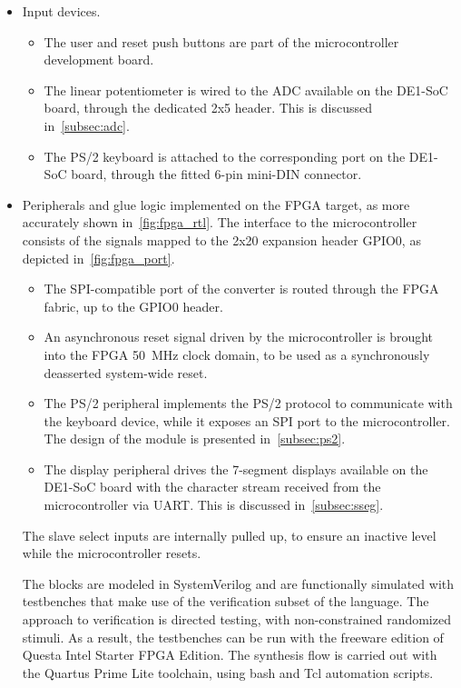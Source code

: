 \begin{itemize}
    \item Input devices.
    \begin{itemize}
        \item The user and reset push buttons are part of the microcontroller development board.
        \item The linear potentiometer is wired to the ADC available on the DE1-SoC board, through the dedicated 2x5 header. This is discussed in~\cref{subsec:adc}.
        \item The PS/2 keyboard is attached to the corresponding port on the DE1-SoC board, through the fitted 6-pin mini-DIN connector.
    \end{itemize}
    
    \item Peripherals and glue logic implemented on the FPGA target, as more accurately shown in~\cref{fig:fpga_rtl}.
    The interface to the microcontroller consists of the signals mapped to the 2x20 expansion header GPIO0, as depicted in~\cref{fig:fpga_port}.
    \begin{itemize}
        \item The SPI-compatible port of the converter is routed through the FPGA fabric, up to the GPIO0 header.
        \item An asynchronous reset signal driven by the microcontroller is brought into the FPGA \qty{50}{\MHz} clock domain, to be used as a synchronously deasserted system-wide reset.
        \item The PS/2 peripheral implements the PS/2 protocol to communicate with the keyboard device, while it exposes an SPI port to the microcontroller. The design of the module is presented in~\cref{subsec:ps2}.
        \item The display peripheral drives the 7-segment displays available on the DE1-SoC board with the character stream received from the microcontroller via UART. This is discussed in~\cref{subsec:sseg}.
    \end{itemize}
    The slave select inputs are internally pulled up, to ensure an inactive level while the microcontroller resets.

    The blocks are modeled in SystemVerilog and are functionally simulated with testbenches that make use of the verification subset of the language. The approach to verification is directed testing, with non-constrained randomized stimuli. As a result, the testbenches can be run with the freeware edition of Questa Intel Starter FPGA Edition.
    The synthesis flow is carried out with the Quartus Prime Lite toolchain, using bash and Tcl automation scripts.


\end{itemize}
